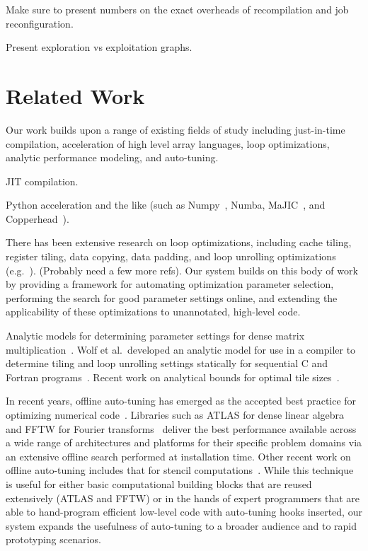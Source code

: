 \documentclass[preprint,9pt]{sigplanconf}
\begin{document}
Make sure to present numbers on the exact overheads of recompilation and job reconfiguration.

Present exploration vs exploitation graphs.

\section{Related Work}
Our work builds upon a range of existing fields of study including just-in-time compilation, acceleration of high level array languages, loop optimizations, analytic performance modeling, and auto-tuning.

JIT compilation.

Python acceleration and the like (such as Numpy~\cite{Dubo96}, Numba, MaJIC~\cite{Alma02}, and Copperhead~\cite{Cata11}).

There has been extensive research on loop optimizations, including cache tiling, register tiling, data copying, data padding, and loop unrolling optimizations (e.g.~\cite{Lam91, Wolf91}). (Probably need a few more refs).  Our system builds on this body of work by providing a framework for automating optimization parameter selection, performing the search for good parameter settings online, and extending the applicability of these optimizations to unannotated, high-level code.

Analytic models for determining parameter settings for dense matrix multiplication~\cite{Cole95, Yoto03, Yoto05}.  Wolf et al.~developed an analytic model for use in a compiler to determine tiling and loop unrolling settings statically for sequential C and Fortran programs~\cite{Wolf96}.  Recent work on analytical bounds for optimal tile sizes~\cite{Shir12}.

In recent years, offline auto-tuning has emerged as the accepted best practice for optimizing numerical code~\cite{Asan06}.  Libraries such as ATLAS for dense linear algebra~\cite{Atlas} and FFTW for Fourier transforms~\cite{Frig05} deliver the best performance available across a wide range of architectures and platforms for their specific problem domains via an extensive offline search performed at installation time.  Other recent work on offline auto-tuning includes that for stencil computations~\cite{Kami10,Datt08}.  While this technique is useful for either basic computational building blocks that are reused extensively (ATLAS and FFTW) or in the hands of expert programmers that are able to hand-program efficient low-level code with auto-tuning hooks inserted, our system expands the usefulness of auto-tuning to a broader audience and to rapid prototyping scenarios.
\end{document}
